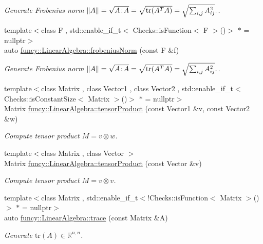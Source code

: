 \begin{DoxyCompactItemize}
\begin{DoxyCompactList}\small\item\em Generate Frobenius norm $ \|A\| = \sqrt{A\negthinspace : \negthinspace A }= \sqrt{\mathrm{tr}(A^TA)} = \sqrt{\sum_{i,j} A_{ij}^2}. $. \end{DoxyCompactList}\item 
{\footnotesize template$<$class F , std\-::enable\-\_\-if\-\_\-t$<$ Checks\-::is\-Function$<$ F $>$()$>$ $\ast$  = nullptr$>$ }\\auto \hyperlink{group__LinearAlgebraGroup_ga65a04179c8ede922ff74470f7ad15a8d}{funcy\-::\-Linear\-Algebra\-::frobenius\-Norm} (const F \&f)
\begin{DoxyCompactList}\small\item\em Generate Frobenius norm $ \|A\| = \sqrt{A\negthinspace : \negthinspace A }= \sqrt{\mathrm{tr}(A^TA)} = \sqrt{\sum_{i,j} A_{ij}^2}. $. \end{DoxyCompactList}\item 
{\footnotesize template$<$class Matrix , class Vector1 , class Vector2 , std\-::enable\-\_\-if\-\_\-t$<$ Checks\-::is\-Constant\-Size$<$ Matrix $>$()$>$ $\ast$  = nullptr$>$ }\\Matrix \hyperlink{group__LinearAlgebraGroup_gabbd540f49b8005cfed789e216443744d}{funcy\-::\-Linear\-Algebra\-::tensor\-Product} (const Vector1 \&v, const Vector2 \&w)
\begin{DoxyCompactList}\small\item\em Compute tensor product $ M = v \otimes w $. \end{DoxyCompactList}\item 
{\footnotesize template$<$class Matrix , class Vector $>$ }\\Matrix \hyperlink{group__LinearAlgebraGroup_gaf2bb42fe59352ef2090cb2907890e1d5}{funcy\-::\-Linear\-Algebra\-::tensor\-Product} (const Vector \&v)
\begin{DoxyCompactList}\small\item\em Compute tensor product $ M = v \otimes v $. \end{DoxyCompactList}\item 
{\footnotesize template$<$class Matrix , std\-::enable\-\_\-if\-\_\-t$<$!\-Checks\-::is\-Function$<$ Matrix $>$()$>$ $\ast$  = nullptr$>$ }\\auto \hyperlink{group__LinearAlgebraGroup_gaeb83634a988175e17cda9206619dc87e}{funcy\-::\-Linear\-Algebra\-::trace} (const Matrix \&A)
\begin{DoxyCompactList}\small\item\em Generate $\mathrm{tr}(A)\in\mathbb{R}^{n,n}$. \end{DoxyCompactList}\item 

\end{DoxyCompactItemize}
